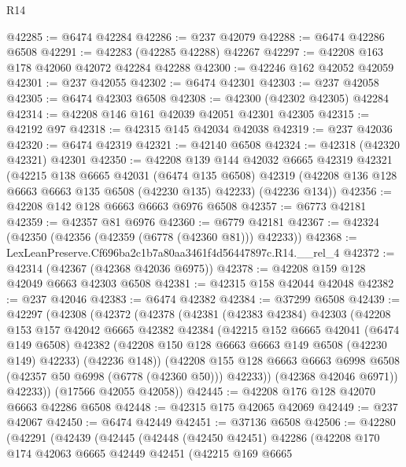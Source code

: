 \begin{lexlean}{R14}
\begin{coremodule}
@42285 := @6474 @42284
@42286 := @237 @42079
@42288 := @6474 @42286 @6508
@42291 := @42283 (@42285 @42288) @42267
@42297 := @42208 @163 @178 @42060 @42072 @42284 @42288
@42300 := @42246 @162 @42052 @42059
@42301 := @237 @42055
@42302 := @6474 @42301
@42303 := @237 @42058
@42305 := @6474 @42303 @6508
@42308 := @42300 (@42302 @42305) @42284
@42314 := @42208 @146 @161 @42039 @42051 @42301 @42305
@42315 := @42192 @97
@42318 := @42315 @145 @42034 @42038
@42319 := @237 @42036
@42320 := @6474 @42319
@42321 := @42140 @6508
@42324 := @42318 (@42320 @42321) @42301
@42350 := @42208
    @139
    @144
    @42032
    @6665
    @42319
    @42321
    (@42215
      @138
      @6665
      @42031
      (@6474 @135 @6508)
      @42319
      (@42208 @136 @128 @6663 @6663 @135 @6508 (@42230 @135) @42233)
      (@42236 @134))
@42356 := @42208 @142 @128 @6663 @6663 @6976 @6508
@42357 := @6773 @42181
@42359 := @42357 @81 @6976
@42360 := @6779 @42181
@42367 := @42324 (@42350 (@42356 (@42359 (@6778 (@42360 @81))) @42233))
@42368 := LexLeanPreserve.Cf696ba2c1b7a80aa3461f4d56447897c.R14.__rel_4
@42372 := @42314 (@42367 (@42368 @42036 @6975))
@42378 := @42208 @159 @128 @42049 @6663 @42303 @6508
@42381 := @42315 @158 @42044 @42048
@42382 := @237 @42046
@42383 := @6474 @42382
@42384 := @37299 @6508
@42439 := @42297
    (@42308
      (@42372
        (@42378
          (@42381
            (@42383 @42384)
            @42303
            (@42208
              @153
              @157
              @42042
              @6665
              @42382
              @42384
              (@42215
                @152
                @6665
                @42041
                (@6474 @149 @6508)
                @42382
                (@42208 @150 @128 @6663 @6663 @149 @6508 (@42230 @149) @42233)
                (@42236 @148))
              (@42208
                @155
                @128
                @6663
                @6663
                @6998
                @6508
                (@42357 @50 @6998 (@6778 (@42360 @50)))
                @42233))
            (@42368 @42046 @6971))
          @42233))
      (@17566 @42055 @42058))
@42445 := @42208 @176 @128 @42070 @6663 @42286 @6508
@42448 := @42315 @175 @42065 @42069
@42449 := @237 @42067
@42450 := @6474 @42449
@42451 := @37136 @6508
@42506 := @42280
    (@42291
      (@42439
        (@42445
          (@42448
            (@42450 @42451)
            @42286
            (@42208
              @170
              @174
              @42063
              @6665
              @42449
              @42451
              (@42215
                @169
                @6665

\end{coremodule}
\end{lexlean}
